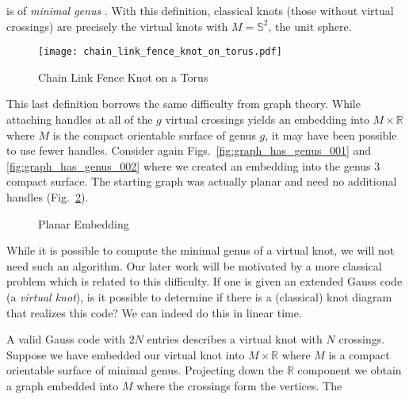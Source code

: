         is of \textit{minimal genus} \cite{KuperbergVirtualLink}.
        With this definition, classical knots (those without virtual crossings)
        are precisely the virtual knots with $M=\mathbb{S}^{2}$,
        the unit sphere.
        \begin{figure}
            \centering
            \texttt{[image: chain\_link\_fence\_knot\_on\_torus.pdf]}
            \caption{Chain Link Fence Knot on a Torus}
            \label{fig:chain_link_fence_knot_on_torus}
        \end{figure}
        \par\hfill\par
        This last definition borrows the same difficulty from graph theory.
        While attaching handles at all of the $g$ virtual crossings yields an
        embedding into $M\times\mathbb{R}$ where $M$ is the compact orientable
        surface of genus $g$, it may have been possible to use fewer handles.
        Consider again Figs.~\ref{fig:graph_has_genus_001} and
        \ref{fig:graph_has_genus_002} where we created an embedding into the
        genus 3 compact surface. The starting graph was actually planar and
        need no additional handles (Fig.~\ref{fig:graph_has_genus_003}).
        \begin{figure}
            \centering
            \caption{Planar Embedding}
            \label{fig:graph_has_genus_003}
        \end{figure}
        \par\hfill\par
        While it is possible to compute the minimal genus of a virtual knot,
        we will not need such an algorithm. Our later work will be motivated
        by a more classical problem which is related to this difficulty.
        If one is given an extended Gauss code (a \textit{virtual knot}),
        is it possible to determine if there is a (classical) knot diagram
        that realizes this code? We can indeed do this in linear time.
        \par\hfill\par
        A valid Gauss code with $2N$ entries describes a virtual knot with
        $N$ crossings. Suppose we have embedded our virtual knot into
        $M\times\mathbb{R}$ where $M$ is a compact orientable surface of
        minimal genus. Projecting down the $\mathbb{R}$ component we obtain
        a graph embedded into $M$ where the crossings form the vertices. The
